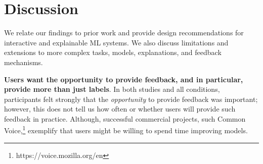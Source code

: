 

\section{Discussion}


We relate our findings to prior work and provide design recommendations for interactive and explainable ML systems. 
%
We also discuss limitations and extensions to more complex tasks, models, explanations, and feedback mechanisms.
%
%
%

\textbf{Users want the opportunity to provide feedback, and in particular, provide more than just labels}. 
%
%
In both studies and all conditions, participants felt strongly that the \textit{opportunity} to provide feedback was important; however, this does not tell us how often or whether users will provide such feedback in practice. Although, successful commercial projects, such Common Voice,\footnote{https://voice.mozilla.org/en} exemplify that users might be willing to spend time improving models. 
%

